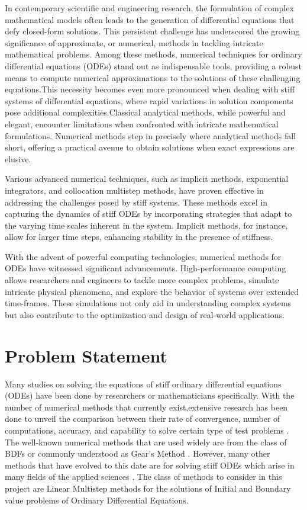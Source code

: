 In contemporary scientific and engineering research, the formulation of complex mathematical models often leads to the generation of differential equations that defy closed-form solutions. This persistent challenge has underscored the growing significance of approximate, or numerical, methods in tackling intricate mathematical problems. Among these methods, numerical techniques for ordinary differential equations (ODEs) stand out as indispensable tools, providing a robust means to compute numerical approximations to the solutions of these challenging equations.This necessity becomes even more pronounced when dealing with stiff systems of differential equations, where rapid variations in solution components pose additional complexities.Classical analytical methods, while powerful and elegant, encounter limitations when confronted with intricate mathematical formulations. Numerical methods step in precisely where analytical methods fall short, offering a practical avenue to obtain solutions when exact expressions are elusive.

Various advanced numerical techniques, such as implicit methods, exponential integrators, and collocation multistep methods, have proven effective in addressing the challenges posed by stiff systems. These methods excel in capturing the dynamics of stiff ODEs by incorporating strategies that adapt to the varying time scales inherent in the system. Implicit methods, for instance, allow for larger time steps, enhancing stability in the presence of stiffness.

With the advent of powerful computing technologies, numerical methods for ODEs have witnessed significant advancements. High-performance computing allows researchers and engineers to tackle more complex problems, simulate intricate physical phenomena, and explore the behavior of systems over extended time-frames. These simulations not only aid in understanding complex systems but also contribute to the optimization and design of real-world applications.

\section{Problem Statement}

Many studies on solving the equations of stiff ordinary differential equations (ODEs) have been done by researchers or mathematicians specifically. With the number of numerical methods that currently exist,extensive research has been done to unveil the comparison between their rate of convergence, number of computations, accuracy, and capability to solve certain type of test problems \cite{Enright1975} . The well-known numerical methods that are used widely are from the class of BDFs or commonly understood as Gear’s Method \cite{BYRNE1977125}. 
However, many other methods that have evolved to this date are for solving stiff ODEs which arise in many fields of the applied sciences \cite{Yatim2013}. The class of methods to consider in this project are Linear Multistep methods for the solutions of Initial and Boundary value problems of Ordinary Differential Equations.

